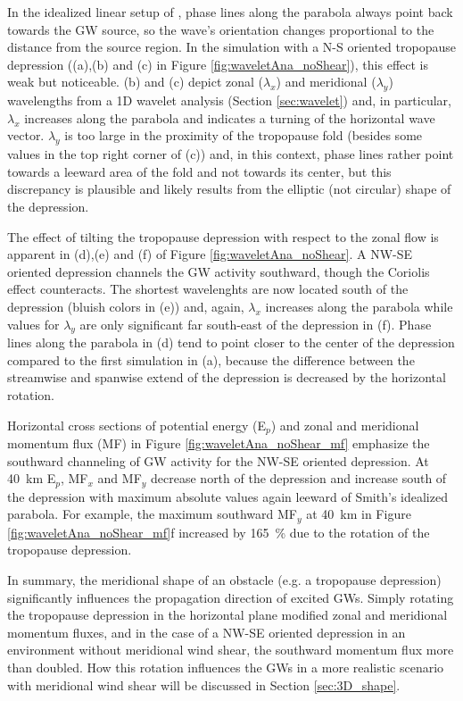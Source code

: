 In the idealized linear setup of \textcite[]{smith_linear_1980}, phase lines along the parabola always point back towards the GW source, so the wave's orientation changes proportional to the distance from the source region. In the simulation with a N-S oriented tropopause depression ((a),(b) and (c) in Figure \ref{fig:waveletAna_noShear}), this effect is weak but noticeable. (b) and (c) depict zonal ($\lambda_x$) and meridional ($\lambda_y$) wavelengths from a 1D wavelet analysis (Section \ref{sec:wavelet}) and, in particular, $\lambda_x$ increases along the parabola and indicates a turning of the horizontal wave vector. $\lambda_y$ is too large in the proximity of the tropopause fold (besides some values in the top right corner of (c)) and, in this context, phase lines rather point towards a leeward area of the fold and not towards its center, but this discrepancy is plausible and likely results from the elliptic (not circular) shape of the depression.

The effect of tilting the tropopause depression with respect to the zonal flow is apparent in (d),(e) and (f) of Figure \ref{fig:waveletAna_noShear}. A NW-SE oriented depression channels the GW activity southward, though the Coriolis effect counteracts. The shortest wavelenghts are now located south of the depression (bluish colors in (e)) and, again, $\lambda_x$ increases along the parabola while values for $\lambda_y$ are only significant far south-east of the depression in (f). Phase lines along the parabola in (d) tend to point closer to the center of the depression compared to the first simulation in (a), because the difference between the streamwise and spanwise extend of the depression is decreased by the horizontal rotation.

Horizontal cross sections of potential energy (E$_p$) and zonal and meridional momentum flux (MF) in Figure \ref{fig:waveletAna_noShear_mf} emphasize the southward channeling of GW activity for the NW-SE oriented depression. At \SI{40}{\kilo\meter} E$_p$, MF$_x$ and MF$_y$ decrease north of the depression and increase south of the depression with maximum absolute values again leeward of Smith's idealized parabola. For example, the maximum southward MF$_y$ at \SI{40}{\kilo\meter} in Figure \ref{fig:waveletAna_noShear_mf}f increased by \SI{165}{\percent} due to the rotation of the tropopause depression.

In summary, the meridional shape of an obstacle (e.g. a tropopause depression) significantly influences the propagation direction of excited GWs. Simply rotating the tropopause depression in the horizontal plane modified zonal and meridional momentum fluxes, and in the case of a NW-SE oriented depression in an environment without meridional wind shear, the southward momentum flux more than doubled. How this rotation influences the GWs in a more realistic scenario with meridional wind shear will be discussed in Section \ref{sec:3D_shape}.

